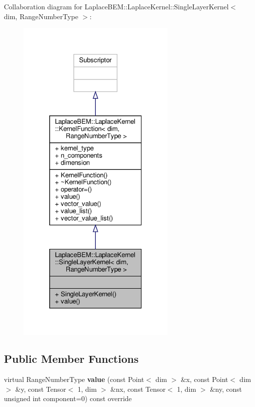 Collaboration diagram for Laplace\+B\+EM\+:\+:Laplace\+Kernel\+:\+:Single\+Layer\+Kernel$<$ dim, Range\+Number\+Type $>$\+:\nopagebreak
\begin{figure}[H]
\begin{center}
\leavevmode
\includegraphics[width=220pt]{classLaplaceBEM_1_1LaplaceKernel_1_1SingleLayerKernel__coll__graph}
\end{center}
\end{figure}
\subsection*{Public Member Functions}
\begin{DoxyCompactItemize}
\item 
\mbox{\label{classLaplaceBEM_1_1LaplaceKernel_1_1SingleLayerKernel_a657e04bd67d8c33adeea1b9d282d6136}} 
virtual Range\+Number\+Type {\bfseries value} (const Point$<$ dim $>$ \&x, const Point$<$ dim $>$ \&y, const Tensor$<$ 1, dim $>$ \&nx, const Tensor$<$ 1, dim $>$ \&ny, const unsigned int component=0) const override
\end{DoxyCompactItemize}
